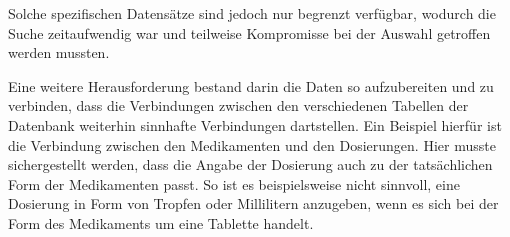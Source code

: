 Solche spezifischen Datensätze sind jedoch nur begrenzt verfügbar, wodurch die Suche zeitaufwendig war 
und teilweise Kompromisse bei der Auswahl getroffen werden mussten.

Eine weitere Herausforderung bestand darin die Daten so aufzubereiten und zu verbinden, dass die Verbindungen zwischen den 
verschiedenen Tabellen der Datenbank weiterhin sinnhafte Verbindungen dartstellen. Ein Beispiel hierfür ist die Verbindung 
zwischen den Medikamenten und den Dosierungen. Hier musste sichergestellt werden, dass die Angabe der Dosierung auch zu der 
tatsächlichen Form der Medikamenten passt. So ist es beispielsweise nicht sinnvoll, eine Dosierung in Form von Tropfen oder 
Millilitern anzugeben, wenn es sich bei der Form des Medikaments um eine Tablette handelt. 
